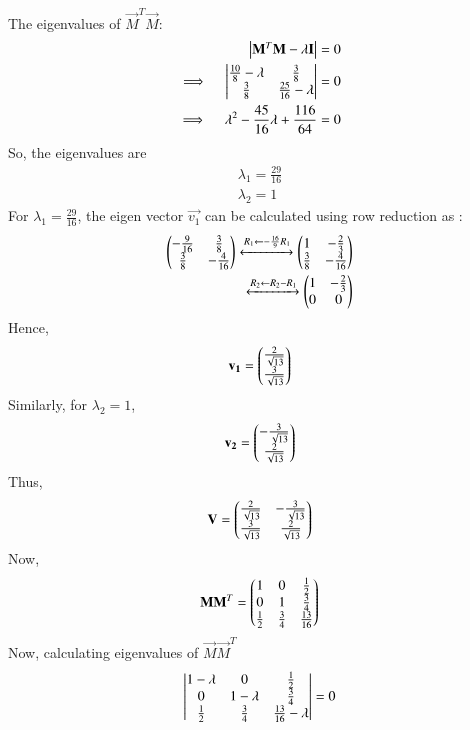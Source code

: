 The eigenvalues of $\vec{M}^T\vec{M}$:
\begin{align}
	\begin{vmatrix}\mathbf{M}^T\mathbf{M}-\lambda \mathbf{I}\end{vmatrix} = 0 \\
	\implies \quad
	\begin{vmatrix}\frac{10}{8}-\lambda & \frac{3}{8} \\ \frac{3}{8} & \frac{25}{16}-\lambda \end{vmatrix} = 0 \\
	\implies \quad
	\lambda^2 - \frac{45}{16}\lambda + \frac{116}{64} = 0
\end{align}
	So, the eigenvalues are 
\begin{align}
	\lambda_1 = \frac{29}{16}	\\
	\lambda_2 = 1
\end{align}
For $\lambda_1 = \frac{29}{16}$, the eigen vector $\vec{v_1}$ can be calculated using row reduction as :
\begin{align}
	\begin{pmatrix}-\frac{9}{16} & \frac{3}{8} \\ \frac{3}{8} & -\frac{4}{16}\end{pmatrix} 
	\xleftrightarrow[]{R_1 \leftarrow - \frac{16}{9}R_1}
	\begin{pmatrix}1 & -\frac{2}{3} \\ \frac{3}{8} & -\frac{4}{16}\end{pmatrix} \\
	\xleftrightarrow[]{R_2 \leftarrow R_2-R_1}
	\begin{pmatrix}1 & -\frac{2}{3} \\ 0 & 0\end{pmatrix} 
\end{align}
Hence, 
\begin{align}
	\mathbf{v_1}= \begin{pmatrix}\frac{2}{\sqrt{13}} \\ \frac{3}{\sqrt{13}}\end{pmatrix}
\end{align}
Similarly, for $\lambda_2=1$, 
\begin{align}
	\mathbf{v_2}= \begin{pmatrix}-\frac{3}{\sqrt{13}} \\ \frac{2}{\sqrt{13}}\end{pmatrix}
\end{align}
Thus, 
\begin{align}
	\mathbf{V}= \begin{pmatrix}\frac{2}{\sqrt{13}} & -\frac{3}{\sqrt{13}} \\
		\frac{3}{\sqrt{13}} & \frac{2}{\sqrt{13}} \end{pmatrix}
\end{align}
Now, 
\begin{align}
	\mathbf{M}\mathbf{M}^T = 
	\begin{pmatrix}1 & 0 & \frac{1}{2} \\ 0 & 1 & \frac{3}{4} \\
		\frac{1}{2} & \frac{3}{4} & \frac{13}{16} \end{pmatrix}
\end{align}
Now, calculating eigenvalues of $\vec{M}\vec{M}^T$
\begin{align}
	\begin{vmatrix}1-\lambda & 0 & \frac{1}{2} \\ 0 & 1-\lambda & \frac{3}{4} \\
		\frac{1}{2} & \frac{3}{4} & \frac{13}{16}-\lambda \end{vmatrix} = 0  
\end{align}
